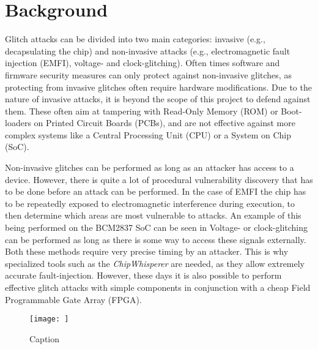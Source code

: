 

\chapter{Background}
\label{chap3}

Glitch attacks can be divided into two main categories: invasive (e.g., decapsulating the chip\cite{intro_to_hw_hacking}) and non-invasive attacks (e.g., electromagnetic fault injection (EMFI), voltage- and clock-glitching). Often times software and firmware security measures can only protect against non-invasive glitches, as protecting from invasive glitches often require hardware modifications\cite{glitchresistor}. Due to the nature of invasive attacks, it is beyond the scope of this project to defend against them. These often aim at tampering with Read-Only Memory (ROM) or Boot-loaders on Printed Circuit Boards (PCBs), and are not effective against more complex systems like a Central Processing Unit (CPU) or a System on Chip (SoC). 

Non-invasive glitches can be performed as long as an attacker has access to a device. However, there is quite a lot of procedural vulnerability discovery that has to be done before an attack can be performed. In the case of EMFI the chip has to be repeatedly exposed to electromagnetic interference during execution, to then determine which areas are most vulnerable to attacks\cite{emfi_injection}. An example of this being performed on the BCM2837 SoC can be seen in 
Voltage- or clock-glitching can be performed as long as there is some way to access these signals externally. Both these methods require very precise timing by an attacker. This is why specialized tools such as the \textit{ChipWhisperer}\cite{chipWhisperer} are needed, as they allow extremely accurate fault-injection. However, these days it is also possible to perform effective glitch attacks with simple components in conjunction with a cheap Field Programmable Gate Array (FPGA)\cite{hole_in_soc}. 

\begin{figure}
    \centering
    \texttt{[image: ]}
    \caption{Caption}
    \label{fig:enter-label}
\end{figure}

